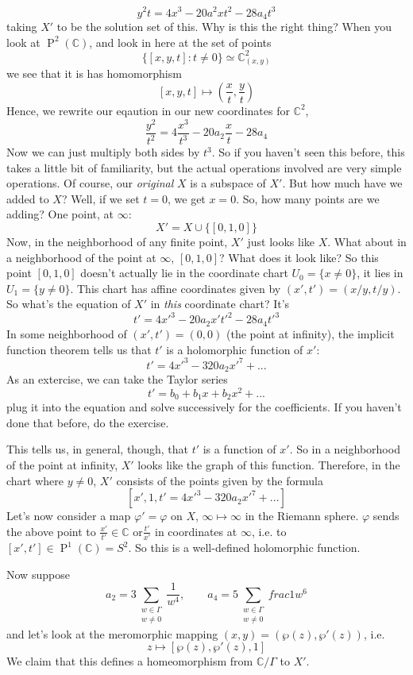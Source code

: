 \documentclass{article}
\newcommand{\mbb}[1]{\mathbb{#1}}
\DeclareMathOperator{\BigP}{P}
\newcommand{\Prj}[2]{\BigP^{#1}({#2})}
\begin{document}
\[y^2t = 4x^3 - 20a^2xt^2 - 28a_4t^3\]
taking \(X'\) to be the solution set of this.
Why is this the right thing? When you look at \(\Prj{2}{\mbb{C}}\), and look in here at the set of points
\[\{[x, y, t]: t \neq 0\} \simeq \mbb{C}^2_{(x, y)}\]
we see that it is has homomorphism
\[[x, y, t] \mapsto \left(\frac{x}{t}, \frac{y}{t}\right)\]
Hence, we rewrite our eqaution in our new coordinates for \(\mbb{C}^2\),
\[\frac{y^2}{t^2} = 4\frac{x^3}{t^3} - 20a_2\frac{x}{t} - 28a_4\]
Now we can just multiply both sides by \(t^3\). So if you haven't seen this before, this takes a little bit of familiarity, but the actual operations involved are very simple operations. Of course, our \textit{original} \(X\) is a subspace of \(X'\). But how much have we added to \(X\)? Well, if we set \(t = 0\), we get \(x = 0\). So, how many points are we adding? One point, at \(\infty\):
\[X' = X \cup \{[0, 1, 0]\}\]
Now, in the neighborhood of any finite point, \(X'\) just looks like \(X\). What about in a neighborhood of the point at \(\infty\), \([0, 1, 0]\)? What does it look like?
So this point \([0, 1, 0]\) doesn't actually lie in the coordinate chart \(U_0 = \{x \neq 0\}\), it lies in \(U_1 = \{y \neq 0\}\). This chart has affine coordinates given by \((x', t') = (x/y, t/y)\). So what's the equation of \(X'\) in \textit{this} coordinate chart? It's
\[t' = 4x'^3 - 20a_2x't'^2 - 28a_4t'^3\]
In some neighborhood of \((x', t') = (0, 0)\) (the point at infinity), the implicit function theorem tells us that \(t'\) is a holomorphic function of \(x'\):
\[t' = 4x'^3 - 320a_2x'^7 + ...\]
As an extercise, we can take the Taylor series
\[t' = b_0 + b_1x + b_2x^2 + ...\]
plug it into the equation and solve successively for the coefficients. If you haven't done that before, do the exercise.

This tells us, in general, though, that \(t'\) is a function of \(x'\). So in a neighborhood of the point at infinity, \(X'\) looks like the graph of this function.
Therefore, in the chart where \(y \neq 0\), \(X'\) consists of the points given by the formula
\[[x', 1, t' = 4x'^3 - 320a_2x'^7 + ...]\]
Let's now consider a map \(\varphi' = \varphi\) on \(X\), \(\infty \mapsto \infty\) in the Riemann sphere. \(\varphi\) sends the above point to \(\frac{x'}{t'} \in \mbb{C}\) or\(\frac{t'}{x'}\) in coordinates at \(\infty\), i.e. to \([x', t'] \in \Prj{1}{\mbb{C}} = S^2\). So this is a well-defined holomorphic function.

Now suppose
\[
a_2 = 3\sum_{\substack{w \in \Gamma \\ w \neq 0}}\frac{1}{w^4},
\qquad a_4 = 5\sum_{\substack{w \in \Gamma \\ w \neq 0}}frac{1}{w^6}
\]
and let's look at the meromorphic mapping \((x, y) = (\wp(z), \wp'(z))\), i.e.
\[z \mapsto [\wp(z), \wp'(z), 1]\]
We claim that this defines a homeomorphism from \(\mbb{C}/\Gamma\) to \(X'\).
\end{document}

